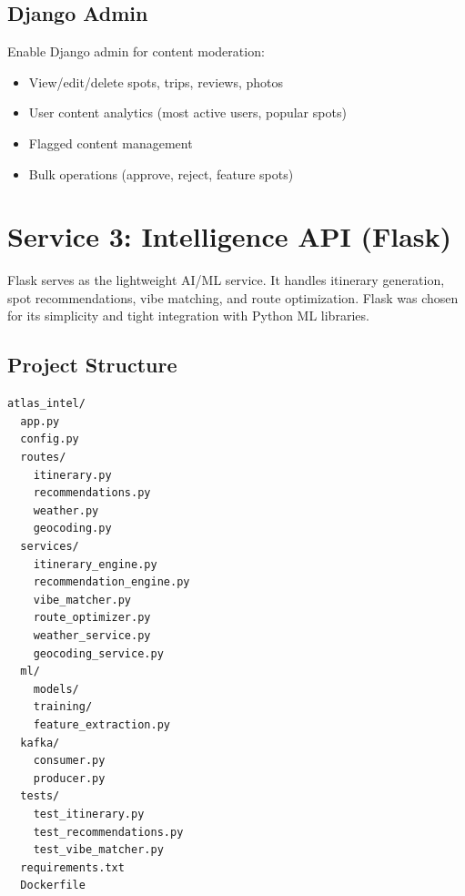 \documentclass[12pt,letterpaper]{article}
\begin{document}
\subsection{Django Admin}
Enable Django admin for content moderation:
\begin{itemize}
  \item View/edit/delete spots, trips, reviews, photos
  \item User content analytics (most active users, popular spots)
  \item Flagged content management
  \item Bulk operations (approve, reject, feature spots)
\end{itemize}

\newpage

\section{Service 3: Intelligence API (Flask)}

Flask serves as the lightweight AI/ML service. It handles itinerary generation, spot recommendations, vibe matching, and route optimization. Flask was chosen for its simplicity and tight integration with Python ML libraries.

\subsection{Project Structure}
\begin{lstlisting}[style=code]
atlas_intel/
  app.py
  config.py
  routes/
    itinerary.py
    recommendations.py
    weather.py
    geocoding.py
  services/
    itinerary_engine.py
    recommendation_engine.py
    vibe_matcher.py
    route_optimizer.py
    weather_service.py
    geocoding_service.py
  ml/
    models/
    training/
    feature_extraction.py
  kafka/
    consumer.py
    producer.py
  tests/
    test_itinerary.py
    test_recommendations.py
    test_vibe_matcher.py
  requirements.txt
  Dockerfile
\end{lstlisting}
\end{document}
